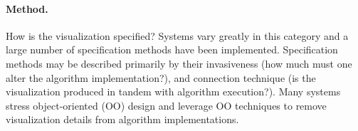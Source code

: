 
\paragraph{Method.} How is the visualization specified? Systems vary greatly in
this category and a large number of specification methods have been implemented.
Specification methods may be described primarily by their invasiveness (how much
must one alter the algorithm implementation?), and connection technique (is the
visualization produced in tandem with algorithm execution?). Many systems stress
object-oriented (OO) design and leverage OO techniques to remove visualization
details from algorithm implementations.

